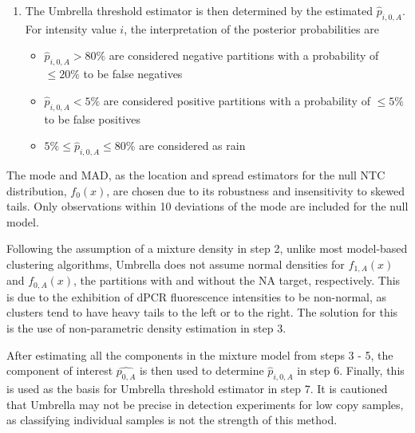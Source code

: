 \begin{enumerate}
    \item The Umbrella threshold estimator is then determined by the estimated \(\hat{p}_{i,0,A}\). For intensity value \(i\), the interpretation of the posterior probabilities are 
    \begin{itemize}
        \item \(\hat{p}_{i,0,A} > 80\%\) are considered negative partitions with a probability of \(\leq20\%\) to be false negatives
        \item \(\hat{p}_{i,0,A} < 5\%\) are considered positive partitions with a probability of \(\leq5\%\) to be false positives
        \item \(5\% \leq \hat{p}_{i,0,A} \leq 80\%\) are considered as rain
    \end{itemize}
\end{enumerate}


The mode and MAD, as the location and spread estimators for the null NTC distribution, \(f_{0}(x)\), are chosen due to its robustness and insensitivity to skewed tails. Only observations within 10 deviations of the mode are included for the null model.

Following the assumption of a mixture density in step 2, unlike most model-based clustering algorithms, Umbrella does not assume normal densities for \(f_{1,A}(x)\) and \(f_{0,A}(x)\), the partitions with and without the NA target, respectively. This is due to the exhibition of dPCR fluorescence intensities to be non-normal, as clusters tend to have heavy tails to the left or to the right. The solution for this is the use of non-parametric density estimation in step 3.

After estimating all the components in the mixture model from steps 3 - 5, the component of interest \(\hat{p_{0,A}}\) is then used to determine \(\hat{p}_{i,0,A}\) in step 6. Finally, this is used as the basis for Umbrella threshold estimator in step 7. It is cautioned that Umbrella may not be precise in detection experiments for low copy samples, as classifying individual samples is not the strength of this method.